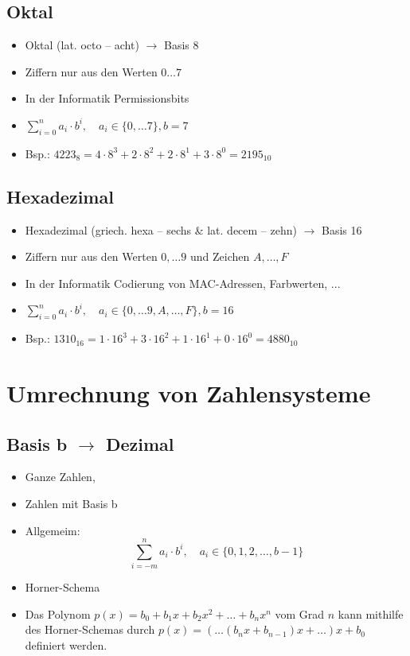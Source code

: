 \documentclass[xcolor=dvipsnames]{beamer}
\begin{document}
\subsection{Oktal}
\begin{frame}
\begin{itemize}
	\item Oktal (lat. octo -- acht) $\rightarrow$ Basis 8
	\item Ziffern nur aus den Werten $0 \dots 7$
	\item In der Informatik Permissionsbits
	\item $ \sum_{i=0}^{n} a_i \cdot b^i, \quad a_i \in \{0, \dots 7\}, b = 7  $
	\item Bsp.: $4223_8 = 4 \cdot 8^3 + 2 \cdot 8^2 + 2 \cdot 8^1 + 3 \cdot 8^0 = 2195_{10}$
\end{itemize}
\end{frame}

\subsection{Hexadezimal}
\begin{frame}
\begin{itemize}
	\item Hexadezimal (griech. hexa -- sechs \& lat. decem -- zehn) $\rightarrow$ Basis 16
	\item Ziffern nur aus den Werten $0, \dots 9$ und Zeichen $A, \dots, F$ 
	\item In der Informatik Codierung von MAC-Adressen, Farbwerten, ...
	\item $ \sum_{i=0}^{n} a_i \cdot b^i, \quad a_i \in \{0, \dots 9, A, \dots, F \}, b = 16  $
	\item Bsp.: $1310_{16} = 1 \cdot 16^3 + 3 \cdot 16^2 + 1 \cdot 16^1 + 0 \cdot 16^0 = 4880_{10}$
\end{itemize}
\end{frame}


\section{Umrechnung von Zahlensysteme}
\subsection{Basis b $\rightarrow$ Dezimal}
\begin{frame}
\begin{itemize}
	\item Ganze Zahlen, 
	\item Zahlen mit Basis b
	\item Allgemeim:
			$$ \sum_{i=-m}^{n} a_i \cdot b^i, \quad a_i \in \{0,1,2, \dots, b-1 \} $$
		\item Horner-Schema
	\item Das Polynom $p(x) = b_0 + b_1 x + b_2 x^2 + \dots + b_n x^n$ vom Grad $n$ kann mithilfe des Horner-Schemas durch $p(x) = (\dots (b_n x + b_{n-1})x + \dots) x + b_0$ definiert werden.

\end{itemize}
\end{frame}
\end{document}
